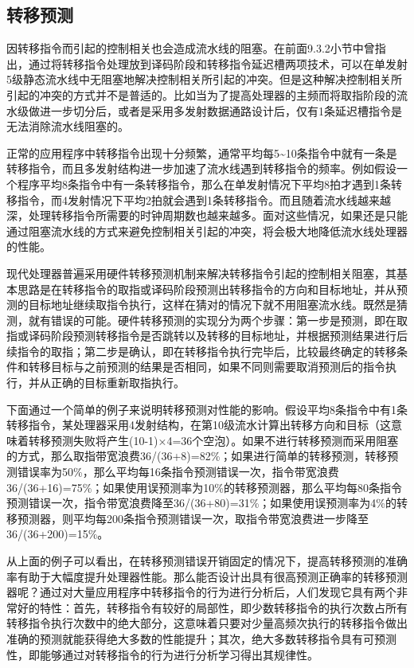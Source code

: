 \documentclass[]{ctexbook}
\begin{document}
\hypertarget{sec-branch-predict}{%
\subsection{转移预测}\label{sec-branch-predict}}

因转移指令而引起的控制相关也会造成流水线的阻塞。在前面9.3.2小节中曾指出，通过将转移指令处理放到译码阶段和转移指令延迟槽两项技术，可以在单发射5级静态流水线中无阻塞地解决控制相关所引起的冲突。但是这种解决控制相关所引起的冲突的方式并不是普适的。比如当为了提高处理器的主频而将取指阶段的流水级做进一步切分后，或者是采用多发射数据通路设计后，仅有1条延迟槽指令是无法消除流水线阻塞的。

正常的应用程序中转移指令出现十分频繁，通常平均每5\textasciitilde10条指令中就有一条是转移指令，而且多发射结构进一步加速了流水线遇到转移指令的频率。例如假设一个程序平均8条指令中有一条转移指令，那么在单发射情况下平均8拍才遇到1条转移指令，而4发射情况下平均2拍就会遇到1条转移指令。而且随着流水线越来越深，处理转移指令所需要的时钟周期数也越来越多。面对这些情况，如果还是只能通过阻塞流水线的方式来避免控制相关引起的冲突，将会极大地降低流水线处理器的性能。

现代处理器普遍采用硬件转移预测机制来解决转移指令引起的控制相关阻塞，其基本思路是在转移指令的取指或译码阶段预测出转移指令的方向和目标地址，并从预测的目标地址继续取指令执行，这样在猜对的情况下就不用阻塞流水线。既然是猜测，就有错误的可能。硬件转移预测的实现分为两个步骤：第一步是预测，即在取指或译码阶段预测转移指令是否跳转以及转移的目标地址，并根据预测结果进行后续指令的取指；第二步是确认，即在转移指令执行完毕后，比较最终确定的转移条件和转移目标与之前预测的结果是否相同，如果不同则需要取消预测后的指令执行，并从正确的目标重新取指执行。

下面通过一个简单的例子来说明转移预测对性能的影响。假设平均8条指令中有1条转移指令，某处理器采用4发射结构，在第10级流水计算出转移方向和目标（这意味着转移预测失败将产生(10-1)×4=36个空泡）。如果不进行转移预测而采用阻塞的方式，那么取指带宽浪费36/(36+8)=82\%；如果进行简单的转移预测，转移预测错误率为50\%，那么平均每16条指令预测错误一次，指令带宽浪费36/(36+16)=75\%；如果使用误预测率为10\%的转移预测器，那么平均每80条指令预测错误一次，指令带宽浪费降至36/(36+80)=31\%；如果使用误预测率为4\%的转移预测器，则平均每200条指令预测错误一次，取指令带宽浪费进一步降至36/(36+200)=15\%。

从上面的例子可以看出，在转移预测错误开销固定的情况下，提高转移预测的准确率有助于大幅度提升处理器性能。那么能否设计出具有很高预测正确率的转移预测器呢？通过对大量应用程序中转移指令的行为进行分析后，人们发现它具有两个非常好的特性：首先，转移指令有较好的局部性，即少数转移指令的执行次数占所有转移指令执行次数中的绝大部分，这意味着只要对少量高频次执行的转移指令做出准确的预测就能获得绝大多数的性能提升；其次，绝大多数转移指令具有可预测性，即能够通过对转移指令的行为进行分析学习得出其规律性。
\end{document}
